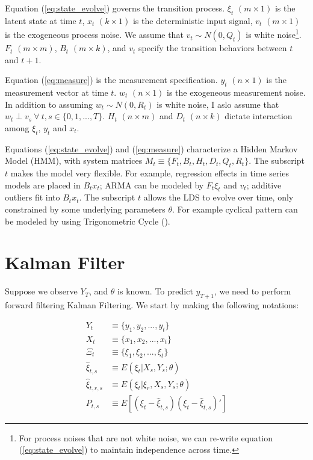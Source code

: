 \documentclass[12pt]{article}
\numberwithin{equation}{section}
\begin{document}
Equation (\ref{eq:state_evolve}) governs the transition process. $\xi_t$ $(m\times 1)$ is the latent state at time $t$, $x_t$ $(k\times 1)$ is the deterministic input signal, $v_t$ $(m\times 1)$ is the exogeneous process noise. We assume that $v_t\sim N(0,Q_t)$ is white noise\footnote{For process noises that are not white noise, we can re-write equation (\ref{eq:state_evolve}) to maintain independence across time.}. $F_t$ $(m\times m)$, $B_t$ $(m\times k)$, and $v_t$ specify the transition behaviors between $t$ and $t+1$. 

Equation (\ref{eq:measure}) is the measurement specification. $y_t$ $(n\times 1)$ is the measurement vector at time $t$. $w_t$ $(n\times 1)$ is the exogeneous measurement noise. In addition to assuming $w_t\sim N(0, R_t)$ is white noise, I aslo assume that  $w_t \perp v_s \ \forall\  t,s\in\{0,1,...,T\}$. $H_t$ $(n\times m)$ and $D_t$ $(n\times k)$ dictate interaction among $\xi_t$, $y_t$ and $x_t$. 

Equations (\ref{eq:state_evolve}) and (\ref{eq:measure}) characterize a Hidden Markov Model (HMM), with system matrices $M_t\equiv\{F_t, B_t, H_t, D_t, Q_t, R_t\}$. The subscript $t$ makes the model very flexible. For example, regression effects in time series models are placed in $B_t x_t$; ARMA can be modeled by $F_t\xi_t$ and $v_t$; additive outliers fit into $B_t x_t$. The subscript $t$ allows the LDS to evolve over time, only constrained by some underlying parameters $\theta$. For example cyclical pattern can be modeled by using Trigonometric Cycle (\cite{harvey_1985}).  

\section{Kalman Filter} \label{sec:filter}

Suppose we observe $Y_T$, and $\theta$ is known. To predict $y_{T+1}$, we need to perform forward filtering Kalman Filtering. We start by making the following notations:

\begin{align*}
    Y_t &\equiv \{y_1, y_2, ..., y_t\} \\
    X_t &\equiv \{x_1, x_2, ..., x_t\} \\
    \Xi_t &\equiv \{\xi_1,\xi_2,...,\xi_t\} \\
    \hat{\xi}_{t,s} &\equiv E(\xi_t|X_{s},Y_{s};\theta) \\
    \hat{\xi}_{t,r,s} &\equiv E(\xi_t|\xi_r,X_{s},Y_{s};\theta) \\
    P_{t,s} &\equiv E[(\xi_t-\hat{\xi}_{t,s})(\xi_t-\hat{\xi}_{t,s})']
\end{align*}
\end{document}
